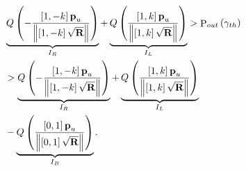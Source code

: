 \documentclass{IEEEtran}
\begin{document}
\begin{equation}\label{eq-19}
\begin{split}
&\underbrace {Q\left( { - \frac{{\left[ {1, - k} \right]{{\textbf{p}}_u}}}{{\left\| {\left[ {1, - k} \right]\sqrt {\textbf{R}} } \right\|}}} \right)}_{I_R} + \underbrace {Q\left( {\frac{{\left[ {1,k} \right]{{\textbf{p}}_u}}}{{\left\| {\left[ {1,k} \right]\sqrt {\textbf{R}} } \right\|}}} \right)}_{I_L} > {{\mathop{\rm P}\nolimits} _{out}}\left( {{\gamma _{th}}} \right)\\
 &> \underbrace {Q\left( { - \frac{{\left[ {1, - k} \right]{{\textbf{p}}_u}}}{{\left\| {\left[ {1, - k} \right]\sqrt {\textbf{R}} } \right\|}}} \right)}_{I_R} + \underbrace {Q\left( {\frac{{\left[ {1,k} \right]{{\textbf{p}}_u}}}{{\left\| {\left[ {1,k} \right]\sqrt {\textbf{R}} } \right\|}}} \right)}_{I_L}\\
 &- \underbrace {Q\left( {\frac{{\left[ {0,1} \right]{{\textbf{p}}_u}}}{{\left\| {\left[ {0,1} \right]\sqrt {\textbf{R}} } \right\|}}} \right)}_{I_B}.
\end{split}
\end{equation}
\end{document}

